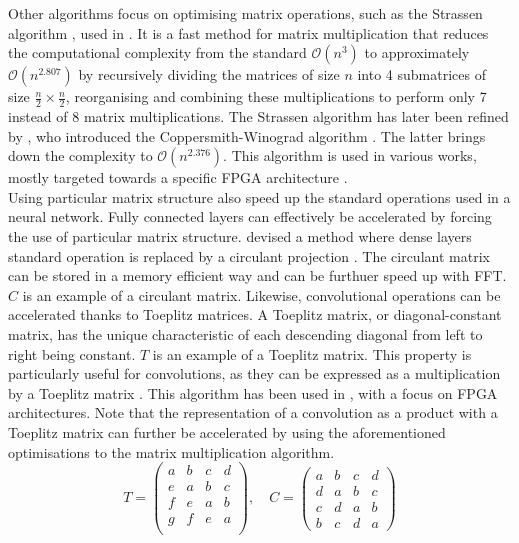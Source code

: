 Other algorithms focus on optimising matrix operations, such as the Strassen
algorithm \cite{strassen1969gaussian}, used in \cite{DBLP:conf/icann/CongX14}.
It is a fast method for matrix multiplication that reduces the computational
complexity from the standard $\mathcal{O}(n^{3})$ to approximately
$\mathcal{O}(n^{2.807})$ by recursively dividing the matrices of size $n$ into 4
submatrices of size $\frac{n}{2} \times \frac{n}{2}$, reorganising and combining
these multiplications to perform only 7 instead of 8 matrix multiplications. The
Strassen algorithm has later been refined by \citeauthor{coppersmith1987matrix},
who introduced the Coppersmith-Winograd algorithm \cite{coppersmith1987matrix}.
The latter brings down the complexity to $\mathcal{O}(n^{2.376})$. This
algorithm is used in various works, mostly targeted towards a specific \ac{FPGA}
architecture \cite{liu2018efficient,lu2018spwa,wang2020winonn}.\\


Using particular matrix structure also speed up the standard operations used in
a neural network. Fully connected layers can  effectively be accelerated by
forcing the use of particular matrix structure.
\citeauthor{DBLP:conf/iccv/ChengYFKCC15} devised a method where dense layers
standard operation is replaced by a circulant projection
\cite{DBLP:conf/iccv/ChengYFKCC15}. The circulant matrix can be stored in a
memory efficient way and can be furthuer speed up with \ac{FFT}. $C$ is an
example of a circulant matrix. Likewise, convolutional operations can be
accelerated thanks to Toeplitz matrices. A Toeplitz matrix, or diagonal-constant
matrix, has the unique characteristic of each descending diagonal from left to
right being constant. $T$ is an example of a Toeplitz matrix. This property is
particularly useful for convolutions, as they can be expressed as a
multiplication by a Toeplitz matrix \cite{gray2006toeplitz}. This algorithm has
been used in \cite{liao2019compressing}, with a focus on \ac{FPGA}
architectures. Note that the representation of a convolution as a product with a
Toeplitz matrix can further be accelerated by using the aforementioned
optimisations to the matrix multiplication algorithm.\\

\[
T = 
\begin{pmatrix}
a & b & c & d \\
e & a & b & c \\
f & e & a & b \\
g & f & e & a \\
\end{pmatrix},
\quad
C = 
\begin{pmatrix}
    a & b & c & d \\
    d & a & b & c \\
    c & d & a & b \\
    b & c & d & a
\end{pmatrix}
\]\\



